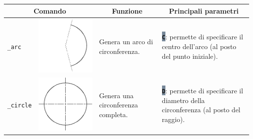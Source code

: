 \documentclass[..]{../IEEEphot}
\newcommand{\param}[1]{\colorbox{LightSlateGray}{\color{Navy}\texttt{\textbf{#1}}}}
\begin{document}
\begin{center}
\begin{longtable}{m{.1\linewidth}m{.2\linewidth}m{.3\linewidth}m{.3\linewidth}}
\toprule
    \multicolumn{2}{c}{\bfseries Comando} &
    \multicolumn{1}{c}{\bfseries Funzione} &
    \multicolumn{1}{c}{\bfseries Principali parametri} \\
\midrule
\texttt{\_arc} & \includegraphics[width = 0.8\linewidth, keepaspectratio]{../images/jpg/_arc.jpg}
& Genera un arco di circonferenza. & 
\param{C}: permette di specificare il centro dell'arco (al posto del punto iniziale).
\\			
\midrule
\texttt{\_circle} & \includegraphics[width = 0.8\linewidth, keepaspectratio]{../images/jpg/_circle.jpg} 
& Genera una circonferenza completa. & 
\param{D}: permette di specificare il diametro della circonferenza (al posto del raggio).


\end{longtable}
\end{center}
\end{document}
